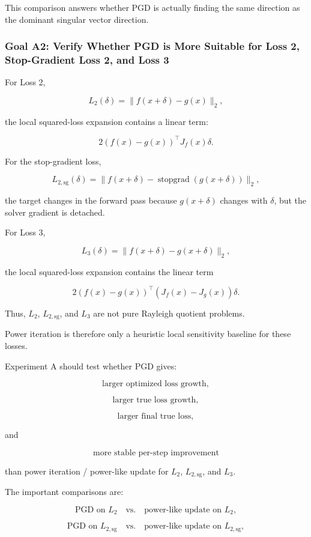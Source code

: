 \documentclass{article}
\begin{document}
This comparison answers whether PGD is actually finding the same direction as the dominant singular vector direction.

\subsubsection{Goal A2: Verify Whether PGD is More Suitable for Loss 2, Stop-Gradient Loss 2, and Loss 3}

For Loss 2,

\[
L_2(\delta)
=
\|f(x+\delta)-g(x)\|_2,
\]

the local squared-loss expansion contains a linear term:

\[
2(f(x)-g(x))^\top J_f(x)\delta.
\]

For the stop-gradient loss,

\[
L_{2,\mathrm{sg}}(\delta)
=
\|f(x+\delta)-\operatorname{stopgrad}(g(x+\delta))\|_2,
\]

the target changes in the forward pass because \(g(x+\delta)\) changes with \(\delta\), but the solver gradient is detached.

For Loss 3,

\[
L_3(\delta)
=
\|f(x+\delta)-g(x+\delta)\|_2,
\]

the local squared-loss expansion contains the linear term

\[
2(f(x)-g(x))^\top (J_f(x)-J_g(x))\delta.
\]

Thus, \(L_2\), \(L_{2,\mathrm{sg}}\), and \(L_3\) are not pure Rayleigh quotient problems.

Power iteration is therefore only a heuristic local sensitivity baseline for these losses.

Experiment A should test whether PGD gives:

\[
\text{larger optimized loss growth},
\]

\[
\text{larger true loss growth},
\]

\[
\text{larger final true loss},
\]

and

\[
\text{more stable per-step improvement}
\]

than power iteration / power-like update for \(L_2\), \(L_{2,\mathrm{sg}}\), and \(L_3\).

The important comparisons are:

\[
\text{PGD on } L_2
\quad
\text{vs.}
\quad
\text{power-like update on } L_2,
\]

\[
\text{PGD on } L_{2,\mathrm{sg}}
\quad
\text{vs.}
\quad
\text{power-like update on } L_{2,\mathrm{sg}},
\]
\end{document}
